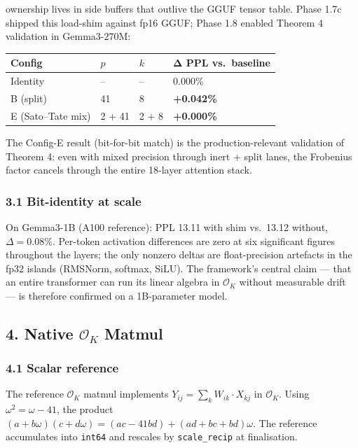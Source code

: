 \documentclass[
  11pt,
]{article}
\begin{document}
ownership lives in side buffers that outlive the GGUF tensor table.
Phase 1.7c shipped this load-shim against fp16 GGUF; Phase 1.8 enabled
Theorem 4 validation in Gemma3-270M:

\begin{longtable}[]{@{}llll@{}}
\toprule
Config & \(p\) & \(k\) & Δ PPL vs.~baseline\tabularnewline
\midrule
\endhead
Identity & -- & -- & 0.000\%\tabularnewline
B (split) & 41 & 8 & \textbf{+0.042\%}\tabularnewline
E (Sato--Tate mix) & 2 + 41 & 2 + 8 & \textbf{+0.000\%}\tabularnewline
\bottomrule
\end{longtable}

The Config-E result (bit-for-bit match) is the production-relevant
validation of Theorem 4: even with mixed precision through inert + split
lanes, the Frobenius factor cancels through the entire 18-layer
attention stack.

\hypertarget{bit-identity-at-scale}{%
\subsubsection{3.1 Bit-identity at scale}\label{bit-identity-at-scale}}

On Gemma3-1B (A100 reference): PPL 13.11 with shim vs.~13.12 without,
\(\Delta = 0.08\%\). Per-token activation differences are zero at six
significant figures throughout the layers; the only nonzero deltas are
float-precision artefacts in the fp32 islands (RMSNorm, softmax, SiLU).
The framework's central claim --- that an entire transformer can run its
linear algebra in \(\mathcal{O}_K\) without measurable drift --- is
therefore confirmed on a 1B-parameter model.

\hypertarget{native-mathcalo_k-matmul}{%
\subsection{\texorpdfstring{4. Native \(\mathcal{O}_K\)
Matmul}{4. Native \textbackslash mathcal\{O\}\_K Matmul}}\label{native-mathcalo_k-matmul}}

\hypertarget{scalar-reference}{%
\subsubsection{4.1 Scalar reference}\label{scalar-reference}}

The reference \(\mathcal{O}_K\) matmul implements
\(Y_{ij} = \sum_k W_{ik} \cdot X_{kj}\) in \(\mathcal{O}_K\). Using
\(\omega^2 = \omega - 41\), the product
\((a + b\omega)(c + d\omega) = (ac - 41 bd) + (ad + bc + bd)\omega\).
The reference accumulates into \texttt{int64} and rescales by
\texttt{scale\_recip} at finalisation.
\end{document}
